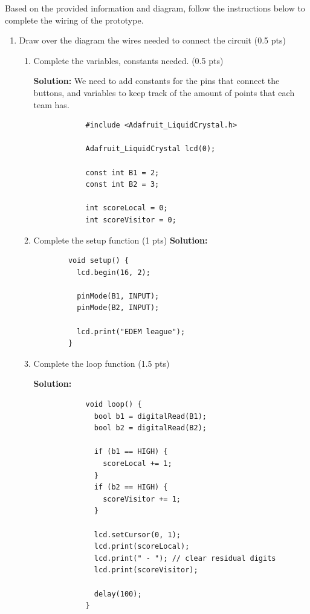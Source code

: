 \documentclass[10pt]{article}
\begin{document}
Based on the provided information and diagram, follow the instructions below to complete the
wiring of the prototype.
\begin{enumerate}
    \item Draw over the diagram the wires needed to connect the circuit (0.5 pts)
    \begin{enumerate}
        \item Complete the variables, constants needed. (0.5 pts)

        \textbf{Solution:}
        We need to add constants for the pins that connect the buttons, and variables to keep track of the amount of points that each team has.
        \begin{verbatim}
            #include <Adafruit_LiquidCrystal.h>
            
            Adafruit_LiquidCrystal lcd(0);
            
            const int B1 = 2;
            const int B2 = 3;
            
            int scoreLocal = 0;
            int scoreVisitor = 0;
        \end{verbatim}
        \item Complete the setup function (1 pts)
        \textbf{Solution:}

        \begin{verbatim}
        void setup() {
          lcd.begin(16, 2);
        
          pinMode(B1, INPUT);
          pinMode(B2, INPUT);
        
          lcd.print("EDEM league");
        }
        \end{verbatim}
    
        \item Complete the loop function (1.5 pts)

        \textbf{Solution:}

        \begin{verbatim}
            void loop() {
              bool b1 = digitalRead(B1);
              bool b2 = digitalRead(B2);
            
              if (b1 == HIGH) {
                scoreLocal += 1;
              }
              if (b2 == HIGH) {
                scoreVisitor += 1;
              }
            
              lcd.setCursor(0, 1);
              lcd.print(scoreLocal);
              lcd.print(" - "); // clear residual digits
              lcd.print(scoreVisitor);
            
              delay(100);
            }
        \end{verbatim}

    \end{enumerate}
\end{enumerate}
\end{document}
